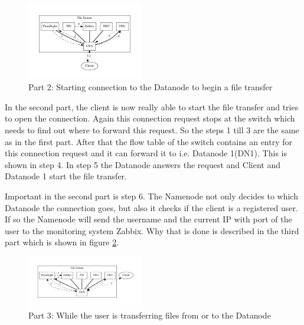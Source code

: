 \begin{figure}[htp]
\centering
\includegraphics[width=0.45\textwidth]{img/connectionToDatanode} 
\caption{Part 2: Starting connection to the Datanode to begin a file transfer}
\label{dn}
\end{figure}     

In the second part, the client is now really able to start the file transfer and tries to open the connection. Again this connection request stops at the switch which needs to find out where to forward this request. So the steps 1 till 3 are the same as in the first part. After that the flow table of the switch contains an entry for this connection request and it can forward it to i.e. Datanode 1(DN1). This is shown in step 4. In step 5 the Datanode answers the request and Client and Datanode 1 start the file transfer. 

Important in the second part is step 6. The Namenode not only decides to which Datanode the connection goes, but also it checks if the client is a registered user. If so the Namenode will send the username and the current IP with port of the user to the monitoring system Zabbix. Why that is done is described in the third part which is shown in figure \ref{wc}.    

\begin{figure}[htp]
\centering
\includegraphics[width=0.45\textwidth]{img/whileConnection} 
\caption{Part 3: While the user is transferring files from or to the Datanode}
\label{wc}
\end{figure}

